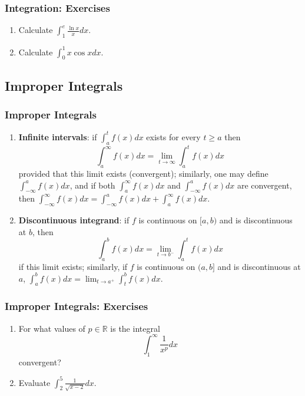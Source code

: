 \documentclass{beamer}
\begin{document}
\begin{frame}
\frametitle{Integration: Exercises}
\begin{enumerate}
\item Calculate $\int_{1}^e \frac{\ln x}{x} dx$.
\vspace*{1.2in}
\item Calculate $\int_{0}^1 x \cos x dx$.
\vspace*{1.2in}
\end{enumerate}
\end{frame}

\subsection{Improper Integrals}
\begin{frame}
\frametitle{Improper Integrals}
\begin{enumerate}
\item \textbf{Infinite intervals}: if $\int_{a}^{t}f(x)dx$ exists for every $t\geq a$ then 
$$
\int_{a}^{\infty}f(x)dx = \lim_{t \rightarrow \infty}\int_{a}^{t}f(x)dx
$$ 
provided that this limit exists (convergent); similarly, one may define $\int_{-\infty}^{a}f(x)dx$, and if both $\int_{a}^{\infty}f(x)dx$ and $\int_{-\infty}^{a}f(x)dx$ are convergent, then $\int_{-\infty}^{\infty}f(x)dx = \int_{-\infty}^{a}f(x)dx + \int_{a}^{\infty}f(x)dx$.
\item \textbf{Discontinuous integrand}: if $f$ is continuous on $[a,b)$ and is discontinuous at $b$, then
$$
\int_a^b f(x) dx = \lim_{t \rightarrow b^-} \int_a^t f(x)dx
$$
if this limit exists; similarly, if $f$ is continuous on $(a,b]$ and is discontinuous at $a$, $\int_a^b f(x) dx = \lim_{t \rightarrow a^+} \int_t^b f(x)dx$.
\end{enumerate}
\end{frame}

\begin{frame}
\frametitle{Improper Integrals: Exercises}
\begin{enumerate}
\item For what values of $p \in \mathbb{R}$ is the integral
$$
\int_1^{\infty} \frac{1}{x^p} dx
$$
convergent?
\vspace*{1in}
\item Evaluate $\int_2^5 \frac{1}{\sqrt{x-2}} dx$.
\vspace*{1.2in}
\end{enumerate}
\end{frame}
\end{document}
